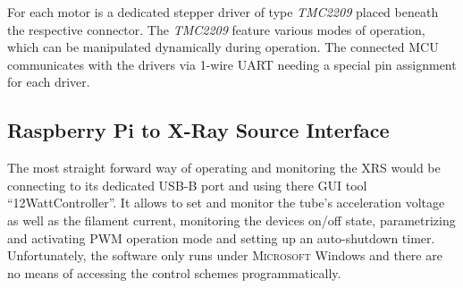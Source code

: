             For each motor is a dedicated stepper driver of type \textit{TMC2209} placed beneath the respective connector.
            The \textit{TMC2209} feature various modes of operation, which can be manipulated dynamically during operation.
            The connected MCU communicates with the drivers via 1-wire UART needing a special pin assignment for each driver.

        \subsection{Raspberry Pi to X-Ray Source Interface}\label{sec:xrs interface board}
            The most straight forward way of operating and monitoring the XRS would be connecting to its dedicated USB-B port and using there GUI tool ``12WattController''.
            It allows to set and monitor the tube's acceleration voltage as well as the filament current, monitoring the devices on/off state, parametrizing and activating PWM operation mode and setting up an auto-shutdown timer.
            Unfortunately, the software only runs under \textsc{Microsoft} Windows and there are no means of accessing the control schemes programmatically.\par\medskip

